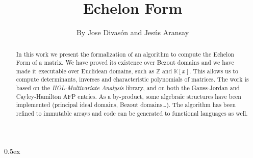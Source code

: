 \documentclass[11pt,a4paper]{article}
\begin{document}
\title{Echelon Form}
\author{By Jose Divas\'on and Jes\'us Aransay}
\maketitle

\begin{abstract}
In this work we present the formalization of an algorithm to compute the Echelon Form of
a matrix. We have proved its existence over Bezout domains and we have made it
executable over Euclidean domains, such as $\mathbb{Z}$ and $\mathbb{K}[x]$. This allows us
to compute determinants, inverses and characteristic polynomials of matrices.
The work is based on the \emph{HOL-Multivariate Analysis} library, and on both the Gauss-Jordan 
and Cayley-Hamilton AFP entries. As a by-product, some algebraic structures have been implemented (principal ideal domains, Bezout domains\dots).
The algorithm has been refined to immutable arrays and code can be generated to 
functional languages as well.
\end{abstract}

\tableofcontents

\parindent 0pt\parskip 0.5ex


\end{document}
